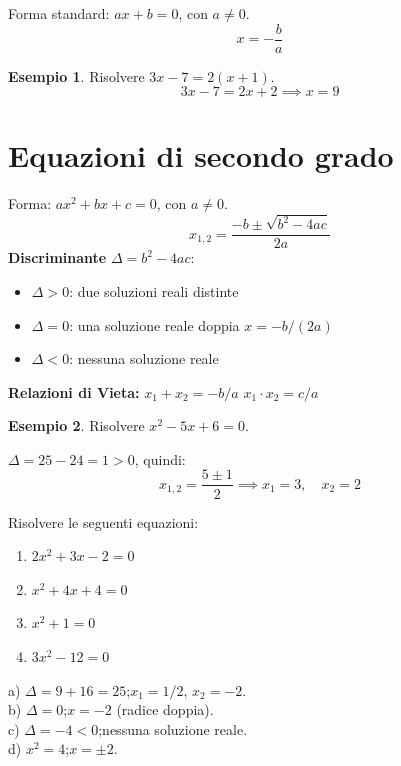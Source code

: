 \documentclass[12pt, a4paper, twoside, openright]{book}
\theoremstyle{definition}
\newtheorem{esempio}{Esempio}[section]
\begin{document}
\begin{formulario}
Forma standard: $ax + b = 0$, con $a \neq 0$.
\[
x = -\frac{b}{a}
\]
\end{formulario}

\begin{esempio}
Risolvere $3x - 7 = 2(x + 1)$.
\[
3x - 7 = 2x + 2 \implies x = 9
\]
\end{esempio}

\section{Equazioni di secondo grado}

\begin{formulario}
Forma: $ax^2 + bx + c = 0$, con $a \neq 0$.
\[
x_{1,2} = \frac{-b \pm \sqrt{b^2 - 4ac}}{2a}
\]
\textbf{Discriminante} $\Delta = b^2 - 4ac$:
\begin{itemize}
  \item $\Delta > 0$: due soluzioni reali distinte
  \item $\Delta = 0$: una soluzione reale doppia $x = -b/(2a)$
  \item $\Delta < 0$: nessuna soluzione reale
\end{itemize}
\textbf{Relazioni di Vieta:} $x_1 + x_2 = -b/a$ \quad $x_1 \cdot x_2 = c/a$
\end{formulario}

\begin{esempio}
Risolvere $x^2 - 5x + 6 = 0$.

$\Delta = 25 - 24 = 1 > 0$, quindi:
\[
x_{1,2} = \frac{5 \pm 1}{2} \implies x_1 = 3, \quad x_2 = 2
\]
\end{esempio}

\begin{esercizio}
Risolvere le seguenti equazioni:
\begin{enumerate}[label=\alph*)]
  \item $2x^2 + 3x - 2 = 0$
  \item $x^2 + 4x + 4 = 0$
  \item $x^2 + 1 = 0$
  \item $3x^2 - 12 = 0$
\end{enumerate}
\end{esercizio}
\begin{soluzione}
a) $\Delta = 9 + 16 = 25$;\quad $x_1 = 1/2$, $x_2 = -2$.\\
b) $\Delta = 0$;\quad $x = -2$ (radice doppia).\\
c) $\Delta = -4 < 0$;\quad nessuna soluzione reale.\\
d) $x^2 = 4$;\quad $x = \pm 2$.
\end{soluzione}
\end{document}
